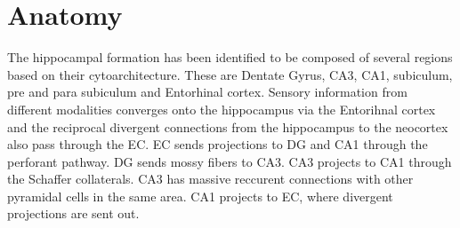 \section{Anatomy}
The hippocampal formation has been identified to be composed of several regions based on their cytoarchitecture. These are Dentate Gyrus, CA3, CA1, subiculum, pre and para subiculum and  Entorhinal cortex. Sensory information from different modalities converges onto the hippocampus via the Entorihnal cortex and the reciprocal divergent connections from the hippocampus to the neocortex also pass through the EC. EC sends projections to DG and CA1 through the perforant pathway. DG sends mossy fibers to CA3. CA3 projects to CA1 through the Schaffer collaterals. CA3 has massive reccurent connections with other pyramidal cells in the same area. CA1 projects to EC, where divergent projections are sent out. 

